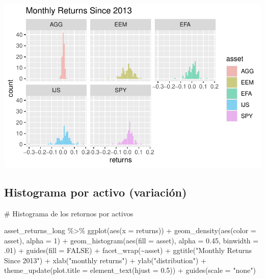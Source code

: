 \documentclass[
  letterpaper,
  DIV=11,
  numbers=noendperiod]{scrartcl}
\newenvironment{Shaded}{\begin{snugshade}}{\end{snugshade}}
\newcommand{\AttributeTok}[1]{\textcolor[rgb]{0.40,0.45,0.13}{#1}}
\newcommand{\CommentTok}[1]{\textcolor[rgb]{0.37,0.37,0.37}{#1}}
\newcommand{\ConstantTok}[1]{\textcolor[rgb]{0.56,0.35,0.01}{#1}}
\newcommand{\DecValTok}[1]{\textcolor[rgb]{0.68,0.00,0.00}{#1}}
\newcommand{\FloatTok}[1]{\textcolor[rgb]{0.68,0.00,0.00}{#1}}
\newcommand{\FunctionTok}[1]{\textcolor[rgb]{0.28,0.35,0.67}{#1}}
\newcommand{\NormalTok}[1]{\textcolor[rgb]{0.00,0.23,0.31}{#1}}
\newcommand{\SpecialCharTok}[1]{\textcolor[rgb]{0.37,0.37,0.37}{#1}}
\newcommand{\StringTok}[1]{\textcolor[rgb]{0.13,0.47,0.30}{#1}}
\begin{document}
\includegraphics[width=0.5\linewidth,height=\textheight,keepaspectratio]{notebook_optimization_test_files/figure-pdf/unnamed-chunk-14-1.pdf}

\subsection{Histograma por activo
(variación)}\label{histograma-por-activo-variaciuxf3n}

\begin{Shaded}
\begin{Highlighting}[]
\CommentTok{\# Histograma de los retornos por activos}

\NormalTok{asset\_returns\_long }\SpecialCharTok{\%\textgreater{}\%}
  \FunctionTok{ggplot}\NormalTok{(}\FunctionTok{aes}\NormalTok{(}\AttributeTok{x =}\NormalTok{ returns)) }\SpecialCharTok{+}
  \FunctionTok{geom\_density}\NormalTok{(}\FunctionTok{aes}\NormalTok{(}\AttributeTok{color =}\NormalTok{ asset), }\AttributeTok{alpha =} \DecValTok{1}\NormalTok{) }\SpecialCharTok{+}
  \FunctionTok{geom\_histogram}\NormalTok{(}\FunctionTok{aes}\NormalTok{(}\AttributeTok{fill =}\NormalTok{ asset), }\AttributeTok{alpha =} \FloatTok{0.45}\NormalTok{, }\AttributeTok{binwidth =}\NormalTok{ .}\DecValTok{01}\NormalTok{) }\SpecialCharTok{+}
  \FunctionTok{guides}\NormalTok{(}\AttributeTok{fill =} \ConstantTok{FALSE}\NormalTok{) }\SpecialCharTok{+}
  \FunctionTok{facet\_wrap}\NormalTok{(}\SpecialCharTok{\textasciitilde{}}\NormalTok{asset) }\SpecialCharTok{+}
  \FunctionTok{ggtitle}\NormalTok{(}\StringTok{"Monthly Returns Since 2013"}\NormalTok{) }\SpecialCharTok{+}
  \FunctionTok{xlab}\NormalTok{(}\StringTok{"monthly returns"}\NormalTok{) }\SpecialCharTok{+}
  \FunctionTok{ylab}\NormalTok{(}\StringTok{"distribution"}\NormalTok{) }\SpecialCharTok{+}
  \FunctionTok{theme\_update}\NormalTok{(}\AttributeTok{plot.title =} \FunctionTok{element\_text}\NormalTok{(}\AttributeTok{hjust =} \FloatTok{0.5}\NormalTok{)) }\SpecialCharTok{+}
  \FunctionTok{guides}\NormalTok{(}\AttributeTok{scale =} \StringTok{"none"}\NormalTok{)}
\end{Highlighting}
\end{Shaded}
\end{document}
